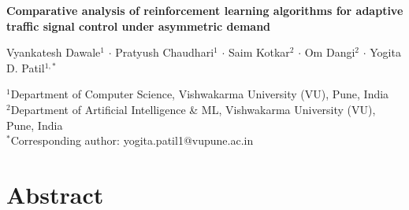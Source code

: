 \documentclass[10pt,a4paper]{article}
\begin{document}
\begin{center}
{\LARGE\bfseries Comparative analysis of reinforcement learning algorithms for adaptive traffic signal control under asymmetric demand\par}

\vspace{1.5em}

{\large Vyankatesh Dawale$^{1}$ $\cdot$ Pratyush Chaudhari$^{1}$ $\cdot$ Saim Kotkar$^{2}$ $\cdot$ Om Dangi$^{2}$ $\cdot$ Yogita D. Patil$^{1,*}$\par}

\vspace{1em}

{\small
$^{1}$Department of Computer Science, Vishwakarma University (VU), Pune, India\\
$^{2}$Department of Artificial Intelligence \& ML, Vishwakarma University (VU), Pune, India\\
$^{*}$Corresponding author: yogita.patil1@vupune.ac.in\par}
\end{center}

\vspace{1em}

\section{Abstract}
\end{document}
